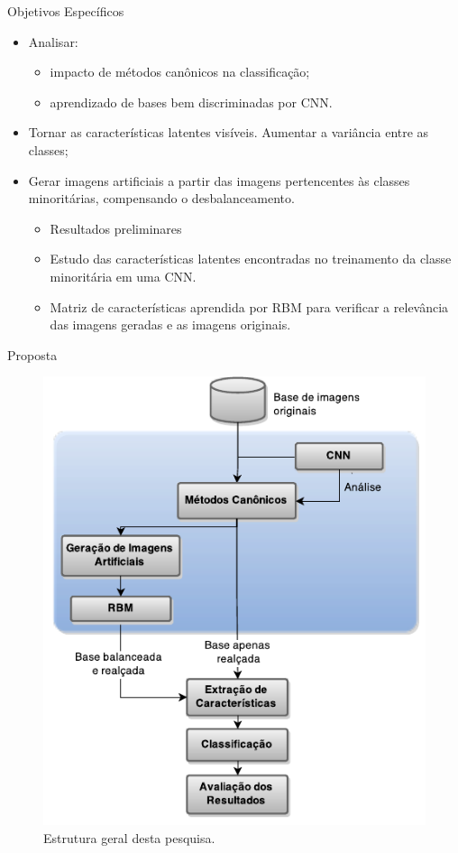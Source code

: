 \documentclass{beamer}
\begin{document}
\begin{frame}{Objetivos Específicos}
\setlength\leftmargini{1em}
\justifying
    \begin{itemize}
      \item Analisar: 
        \begin{itemize}
          \item impacto de métodos canônicos na classificação;
          \item aprendizado de bases bem discriminadas por CNN.
        \end{itemize}
      \item Tornar as características latentes visíveis. Aumentar a variância entre as classes;%
      \item Gerar imagens artificiais a partir das imagens pertencentes às classes minoritárias, compensando o desbalanceamento. 
      \pause
        \begin{itemize}
          \item Resultados preliminares 
          \item Estudo das características latentes encontradas no treinamento da classe minoritária em uma CNN.
          \item Matriz de características aprendida por RBM para verificar a relevância das imagens geradas e as imagens originais.
        \end{itemize}
    \end{itemize}
\end{frame}
\begin{frame}{Proposta}
\begin{figure}
    \includegraphics[height=0.75\textheight]{figuras/geral.pdf}
    \caption{Estrutura geral desta pesquisa.}
\end{figure}
\end{frame}
\end{document}
